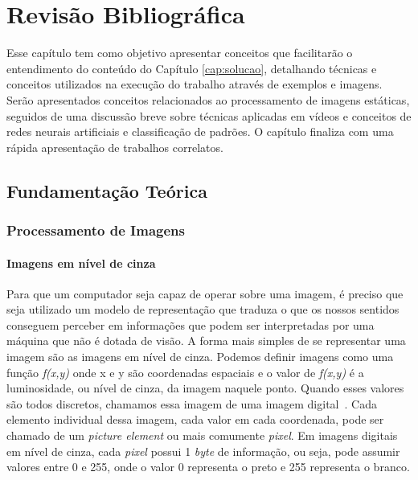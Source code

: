 \chapter{Revisão Bibliográfica}\label{cap:fundament}



Esse capítulo tem como objetivo apresentar conceitos que facilitarão o entendimento do conteúdo do Capítulo \ref{cap:solucao}, detalhando técnicas e conceitos utilizados na execução do trabalho através de exemplos e imagens. Serão apresentados conceitos relacionados ao processamento de imagens estáticas, seguidos de uma discussão breve sobre técnicas aplicadas em vídeos e conceitos de redes neurais artificiais e classificação de padrões. O capítulo finaliza com uma rápida apresentação de trabalhos correlatos.


\section{Fundamentação Teórica}

\subsection{Processamento de Imagens}\label{sec:processamento}

\subsubsection{Imagens em nível de cinza}

Para que um computador seja capaz de operar sobre uma imagem, é preciso que seja utilizado um modelo de representação que traduza o que os nossos sentidos conseguem perceber em informações que podem ser interpretadas por uma máquina que não é dotada de visão. A forma mais simples de se representar uma imagem são as imagens em nível de cinza. Podemos definir imagens como uma função \textit{f{(x,y)}} onde x e y são coordenadas espaciais e o valor de  \textit{f{(x,y)}} é a luminosidade, ou nível de cinza, da imagem naquele ponto. Quando esses valores são todos discretos, chamamos essa imagem de uma imagem digital~\cite{gonzalez2009digital}. Cada elemento individual dessa imagem, cada valor em cada coordenada, pode ser chamado de um \textit{picture element} ou mais comumente \textit{pixel}. Em imagens digitais em nível de cinza, cada \textit{pixel} possui 1 \textit{byte} de informação, ou seja, pode assumir valores entre 0 e 255, onde o valor 0 representa o preto e 255 representa o branco. 

